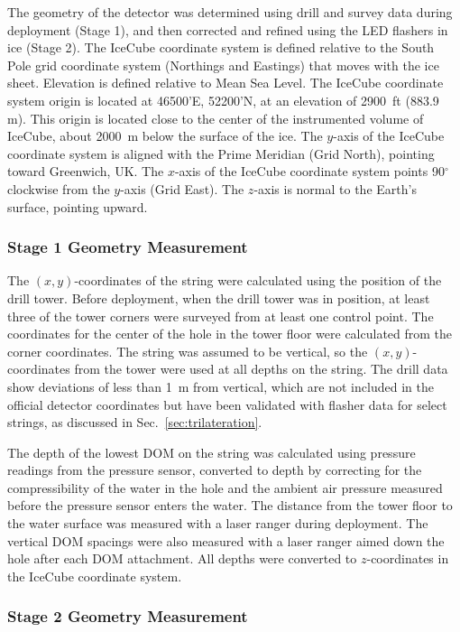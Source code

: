 The geometry of the detector was determined using drill and survey data
during deployment (Stage 1), and then corrected and refined using the LED
flashers in ice (Stage 2). The IceCube coordinate system is
defined relative to the South Pole grid coordinate system (Northings and
Eastings) that moves with the ice sheet.  Elevation is defined relative to
Mean Sea Level.  The IceCube coordinate system origin
is located at 46500'E, 52200'N, at an elevation of 2900~ft (883.9
m).  This origin is located close to the center of the instrumented volume of
IceCube, about 2000~m below the surface of the ice. The $y$-axis of
the IceCube coordinate system is aligned with the Prime Meridian (Grid North),
pointing toward Greenwich, UK. The $x$-axis of the IceCube coordinate
system points 90$^{\circ}$ clockwise from the $y$-axis (Grid East). The $z$-axis is
normal to the Earth's surface, pointing upward. 

\subsubsection{\label{subsec:stage1_geo}Stage 1 Geometry Measurement}
The $(x,y)$-coordinates of the string were calculated using the position of
the drill tower. Before deployment, when the drill tower was in position, at
least three of the tower corners were surveyed from at least one control
point.  The coordinates for the center of the hole in the tower floor were
calculated from the corner coordinates. The string was assumed to be
vertical, so the $(x,y)$-coordinates from the tower were used at all
depths on the string. The drill
data show deviations of less than 1~m from vertical, which are not
included in the official detector coordinates but have been validated
with flasher data for select strings, as discussed in Sec.~\ref{sec:trilateration}. 

The depth of the lowest DOM on the string was calculated using pressure
readings from the pressure sensor, converted to depth by correcting for the
compressibility of the water in the hole and the ambient air pressure
measured before the pressure sensor enters the water. The distance from the
tower floor to the water surface was measured with a laser ranger
during deployment. The
vertical DOM spacings were also measured with a laser
ranger aimed down the hole after each DOM attachment. All depths were
converted to $z$-coordinates in the IceCube 
coordinate system.

\subsubsection{\label{subsec:stage2_geo}Stage 2 Geometry Measurement}

